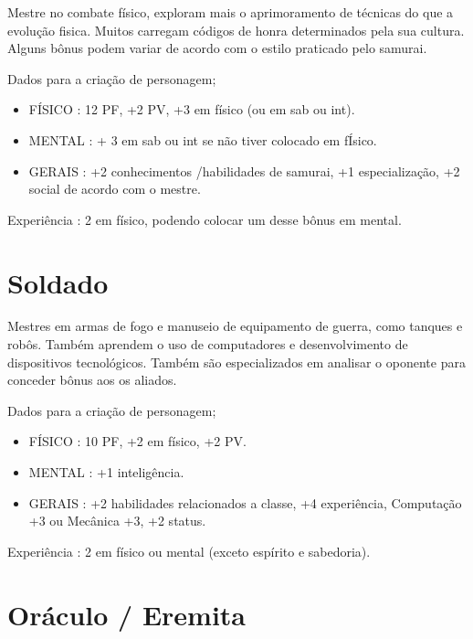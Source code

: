 Mestre no combate físico, exploram mais o aprimoramento de técnicas do que a evolução fisica. Muitos carregam códigos de honra determinados pela sua cultura. Alguns bônus podem variar de acordo com o estilo praticado pelo samurai.

Dados para a criação de personagem;

\begin{itemize}

	\item FÍSICO : 12 PF, +2 PV, +3 em físico (ou em sab ou int).

	\item MENTAL : + 3 em sab ou int se não tiver colocado em fÍsico.

	\item GERAIS : +2 conhecimentos /habilidades de samurai, +1 especialização, +2 social de acordo com o mestre.

\end{itemize}

Experiência : 2 em físico, podendo colocar um desse bônus em mental.

\section{Soldado}

Mestres em armas de fogo e manuseio de equipamento de guerra, como tanques e robôs. Também aprendem o uso de computadores e desenvolvimento de dispositivos tecnológicos. Também são especializados em analisar o oponente para conceder bônus aos os aliados.

Dados para a criação de personagem;

\begin{itemize}


	\item FÍSICO : 10 PF, +2 em físico, +2 PV.

	\item MENTAL : +1 inteligência.

	\item GERAIS : +2 habilidades relacionados a classe, +4 experiência, Computação +3 ou Mecânica +3, +2 status.

\end{itemize}

Experiência : 2 em físico ou mental (exceto espírito e sabedoria).


\section{Oráculo / Eremita}

